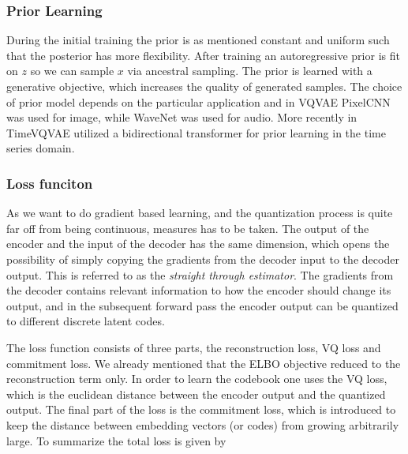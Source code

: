 \documentclass[../../thesis.tex]{subfiles}
\begin{document}


\subsubsection{Prior Learning}
During the initial training the prior is as mentioned constant and uniform such that the posterior has more flexibility. After training an autoregressive prior is fit on $z$ so we can sample $x$ via ancestral sampling. The prior is learned with a generative objective, which increases the quality of generated samples. The choice of prior model depends on the particular application and in VQVAE PixelCNN \cite{oord2016pixel} was used for image, while WaveNet \cite{oord2016wavenet} was used for audio. More recently in TimeVQVAE \cite{TimeVQVAE} utilized a bidirectional transformer \cite{chang2022maskgit} for prior learning in the time series domain. 

\subsubsection{Loss funciton}
\label{section:VQVAELoss}
As we want to do gradient based learning, and the quantization process is quite far off from being continuous, measures has to be taken. The output of the encoder and the input of the decoder has the same dimension, which opens the possibility of simply copying the gradients from the decoder input to the decoder output. This is referred to as the \textit{straight through estimator}. The gradients from the decoder contains relevant information to how the encoder should change its output, and in the subsequent forward pass the encoder output can be quantized to different discrete latent codes.\newline

The loss function consists of three parts, the reconstruction loss, VQ loss and commitment loss. We already mentioned that the ELBO objective reduced to the reconstruction term only. In order to learn the codebook one uses the VQ loss, which is the euclidean distance between the encoder output and the quantized output. The final part of the loss is the commitment loss, which is introduced to keep the distance between embedding vectors (or codes) from growing arbitrarily large. To summarize the total loss is given by
\end{document}
